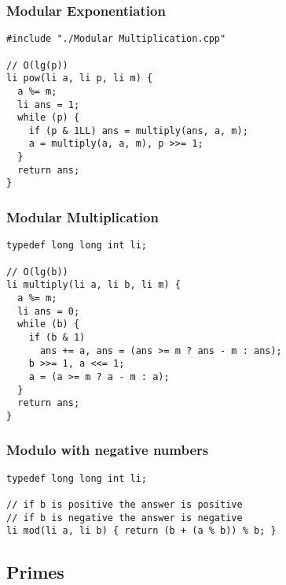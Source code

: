 \documentclass[twoside]{article}
\begin{document}
\begin{multicols*}{2}
\subsubsectionfont{\large\bfseries\sffamily\underline}
\subsubsection*{Modular Exponentiation}
\begin{verbatim}
#include "./Modular Multiplication.cpp"

// O(lg(p))
li pow(li a, li p, li m) {
  a %= m;
  li ans = 1;
  while (p) {
    if (p & 1LL) ans = multiply(ans, a, m);
    a = multiply(a, a, m), p >>= 1;
  }
  return ans;
}
\end{verbatim}

\subsubsectionfont{\large\bfseries\sffamily\underline}
\subsubsection*{Modular Multiplication}
\begin{verbatim}
typedef long long int li;

// O(lg(b))
li multiply(li a, li b, li m) {
  a %= m;
  li ans = 0;
  while (b) {
    if (b & 1)
      ans += a, ans = (ans >= m ? ans - m : ans);
    b >>= 1, a <<= 1;
    a = (a >= m ? a - m : a);
  }
  return ans;
}
\end{verbatim}

\subsubsectionfont{\large\bfseries\sffamily\underline}
\subsubsection*{Modulo with negative numbers}
\begin{verbatim}
typedef long long int li;

// if b is positive the answer is positive
// if b is negative the answer is negative
li mod(li a, li b) { return (b + (a % b)) % b; }
\end{verbatim}

\subsectionfont{\bfseries\sffamily\centering\LARGE}
\vspace{0em}
\subsection*{Primes}
\vspace{2em}
\subsubsectionfont{\large\bfseries\sffamily\underline}

\end{multicols*}
\end{document}
